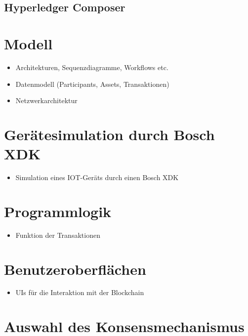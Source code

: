 \subsection{Hyperledger Composer}

\section{Modell}
\begin{itemize}
    \item Architekturen, Sequenzdiagramme, Workflows etc.
    \item Datenmodell (Participants, Assets, Transaktionen)
    \item Netzwerkarchitektur
\end{itemize}

\section{Gerätesimulation durch Bosch XDK}
\begin{itemize}
    \item Simulation eines IOT-Geräts durch einen Bosch XDK
\end{itemize}

\section{Programmlogik}
\begin{itemize}
    \item Funktion der Transaktionen
\end{itemize}

\section{Benutzeroberflächen}
\begin{itemize}
    \item UIs für die Interaktion mit der Blockchain
\end{itemize}

\section{Auswahl des Konsensmechanismus}



